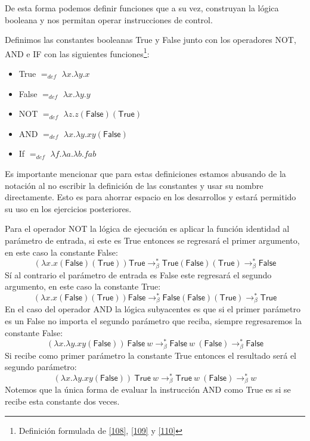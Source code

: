  De esta forma podemos definir funciones que a su vez, construyan la lógica booleana y nos permitan operar instrucciones de control.
 \begin{definition} Definimos las constantes booleanas \textsf{True} y \textsf{False} junto con los operadores \textsf{NOT}, \textsf{AND} e \textsf{IF} con las siguientes funciones\footnote{Definición formulada de \hyperlink{108}{[108]},  \hyperlink{109}{[109]} y  \hyperlink{110}{[110]}}:\\
 	
 	\begin{itemize}
 		\item \textsf{True}  $=_{def}$  $\lambda x.\lambda y.x$ 
 		\item \textsf{False}  $=_{def}$   $\lambda x.\lambda y.y$ 
 		\item\textsf{NOT}   $=_{def}$   $\lambda z. z  (\textsf{False}) (\textsf{True})$ 
 		\item \textsf{AND}  $=_{def}$  $\lambda x.\lambda y. xy (\textsf{False})$ 
 		\item \textsf{If}      $=_{def}$ $\lambda f.\lambda a.\lambda b.fab $
 	\end{itemize}
 	\bigskip
 	Es importante mencionar que para estas definiciones estamos abusando de la notación al no escribir la definición de las constantes y usar su nombre directamente. Esto es para ahorrar espacio en los desarrollos y estará permitido su uso en los ejercicios posteriores.
 \end{definition}
 
 Para el operador \textsf{NOT} la lógica de ejecución es aplicar la función identidad al parámetro de entrada, si este es \textsf{True} entonces se regresará el primer argumento, en este caso la constante \textsf{False}: \[ (\lambda x.x (\textsf{False})(\textsf{True}))\textsf{True} \to_\beta^* \textsf{True}(\textsf{False})(\textsf{True}) \to_\beta^* \textsf{False}\] 
 Sí al contrario el parámetro de entrada es \textsf{False} este regresará el segundo argumento, en este caso la constante \textsf{True}: \[ (\lambda x.x (\textsf{False})(\textsf{True}))\textsf{False} \to_\beta^* \textsf{False}(\textsf{False})(\textsf{True}) \to_\beta^* \textsf{True}\]
 En el caso del operador \textsf{AND} la lógica subyacentes es que si el primer parámetro es un \textsf{False} no importa el segundo parámetro que reciba, siempre regresaremos la constante \textsf{False}:
 \[ (\lambda x.\lambda y. xy (\textsf{False}))\ \textsf{False}\  w \to_\beta^* \textsf{False}\ w\ (\textsf{False}) \to_\beta^* \textsf{False}  \]
 Si recibe como primer parámetro la constante \textsf{True} entonces el resultado será el segundo parámetro:
 \[ (\lambda x.\lambda y. xy (\textsf{False}))\ \textsf{True}\  w \to_\beta^* \textsf{True}\ w\ (\textsf{False}) \to_\beta^* w  \]
 Notemos que la única forma de evaluar la instrucción \textsf{AND} como \textsf{True} es si se recibe esta constante dos veces.
 
